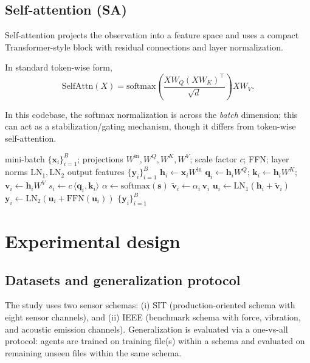 \documentclass[refree,sn-basic]{sn-jnl} %
\begin{document}
\subsection{Self-attention (SA)}
Self-attention projects the observation into a feature space and uses a compact Transformer-style block with residual connections and layer normalization.

In standard token-wise form,
\begin{equation}
\mathrm{SelfAttn}(X)=\mathrm{softmax}\left(\frac{XW_Q(XW_K)^\top}{\sqrt{d}}\right)XW_V.
\end{equation}

In this codebase, the softmax normalization is across the \emph{batch} dimension; this can act as a stabilization/gating mechanism, though it differs from token-wise self-attention.

\begin{algorithm}[t]
\caption{Self-attention feature extractor (forward pass; batch-normalized gating)}
\label{alg:sa_forward}
\begin{algorithmic}[1]
\Require mini-batch $\{\mathbf{x}_i\}_{i=1}^{B}$; projections $W^{\mathrm{in}},W^Q,W^K,W^V$; scale factor $c$; FFN; layer norms $\mathrm{LN}_1,\mathrm{LN}_2$
\Ensure output features $\{\mathbf{y}_i\}_{i=1}^{B}$
        \State $\mathbf{h}_i \gets \mathbf{x}_i W^{\mathrm{in}}$
        \State $\mathbf{q}_i \gets \mathbf{h}_i W^Q$; $\mathbf{k}_i \gets \mathbf{h}_i W^K$; $\mathbf{v}_i \gets \mathbf{h}_i W^V$
        \State $s_i \gets c\,\langle \mathbf{q}_i,\mathbf{k}_i\rangle$ 
\EndFor
\State $\alpha \gets \mathrm{softmax}(\mathbf{s})$ 
        \State $\tilde{\mathbf{v}}_i \gets \alpha_i\,\mathbf{v}_i$
        \State $\mathbf{u}_i \gets \mathrm{LN}_1(\mathbf{h}_i + \tilde{\mathbf{v}}_i)$
        \State $\mathbf{y}_i \gets \mathrm{LN}_2(\mathbf{u}_i + \mathrm{FFN}(\mathbf{u}_i))$
\EndFor
\State \Return $\{\mathbf{y}_i\}_{i=1}^{B}$
\end{algorithmic}
\end{algorithm}

\section{Experimental design}
\label{sec:experiment}
\subsection{Datasets and generalization protocol}
The study uses two sensor schemas: (i) SIT (production-oriented schema with eight sensor channels), and (ii) IEEE (benchmark schema with force, vibration, and acoustic emission channels). Generalization is evaluated via a one-vs-all protocol: agents are trained on training file(s) within a schema and evaluated on remaining unseen files within the same schema.
\end{document}
